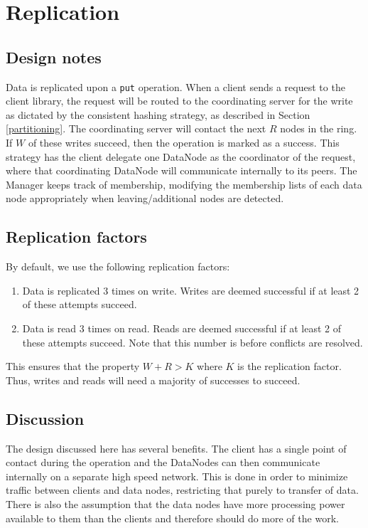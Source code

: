 \documentclass[paper=a4,fontsize=11pt]{report} %
\numberwithin{equation}{section} %
\numberwithin{figure}{section} %
\numberwithin{table}{section} %
\begin{document}
\section{Replication}
\subsection{Design notes}
Data is replicated upon a \texttt{put} operation. When a client sends a request to the client library, the request will be routed to the coordinating server for the write as dictated by the consistent hashing strategy, as described in Section \ref{partitioning}. The coordinating server will contact the next $R$ nodes in the ring. If $W$ of these writes succeed, then the operation is marked as a success. This strategy has the client delegate one DataNode as the coordinator of the request, where that coordinating DataNode will communicate internally to its peers. The Manager keeps track of membership, modifying the membership lists of each data node appropriately when leaving/additional nodes are detected.

\subsection{Replication factors}
By default, we use the following replication factors:
\begin{enumerate}
\item Data is replicated 3 times on write. Writes are deemed successful if at least 2 of these attempts succeed.
\item Data is read 3 times on read. Reads are deemed successful if at least 2 of these attempts succeed. Note that this number is before conflicts are resolved.
\end{enumerate}

This ensures that the property $W + R > K$ where $K$ is the replication factor. Thus, writes and reads will need a majority of successes to succeed.

\subsection{Discussion}
The design discussed here has several benefits. The client has a single point of contact during the operation and the DataNodes can then communicate internally on a separate high speed network. This is done in order to minimize traffic between clients and data nodes, restricting that purely to transfer of data. There is also the assumption that the data nodes have more processing power available to them than the clients and therefore should do more of the work.
\end{document}
